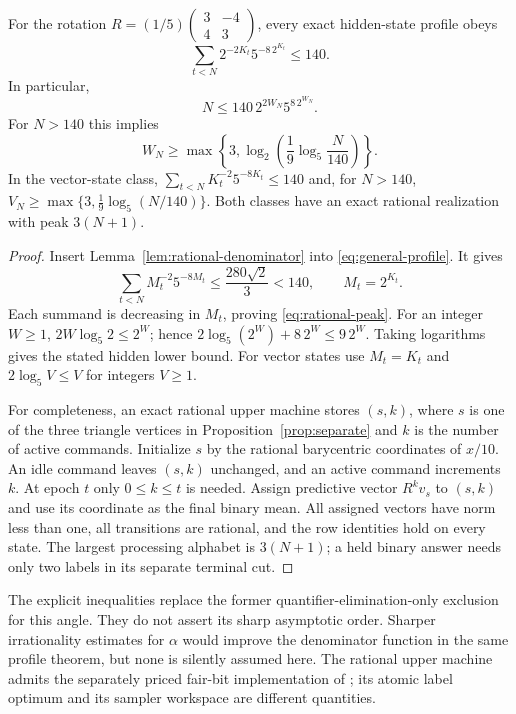 \begin{theorem}\label{thm:rational}
For the rotation $R=(1/5)\left(\begin{smallmatrix}3&-4\\4&3\end{smallmatrix}\right)$,
every exact hidden-state profile obeys
\begin{equation}\label{eq:rational-profile}
           \sum_{t<N}2^{-2K_t}5^{-8\,2^{K_t}}\le140.
\end{equation}
In particular,
\begin{equation}\label{eq:rational-peak}
                 N\le140\,2^{2W_N}5^{8\,2^{W_N}}.
\end{equation}
For $N>140$ this implies
\[
 W_N\ge\max\left\{3,
       \log_2\left(\frac19\log_5\frac N{140}\right)\right\}.
\]
In the vector-state class,
$\sum_{t<N}K_t^{-2}5^{-8K_t}\le140$ and, for $N>140$,
$V_N\ge\max\{3,\frac19\log_5(N/140)\}$.
Both classes have an exact rational realization with peak $3(N+1)$.
\end{theorem}
\begin{proof}
Insert Lemma~\ref{lem:rational-denominator} into
\eqref{eq:general-profile}. It gives
\[
 \sum_{t<N}M_t^{-2}5^{-8M_t}
       \le\frac{280\sqrt2}{3}<140,
 \qquad M_t=2^{K_t}.
\]
Each summand is decreasing in $M_t$, proving \eqref{eq:rational-peak}.
For an integer $W\ge1$, $2W\log_5 2\le2^W$; hence
$2\log_5(2^W)+8\,2^W\le9\,2^W$.
Taking logarithms gives the stated hidden lower bound.
For vector states use $M_t=K_t$ and
$2\log_5 V\le V$ for integers $V\ge1$.

For completeness, an exact rational upper machine stores $(s,k)$,
where $s$ is one of the three triangle vertices in
Proposition~\ref{prop:separate} and $k$ is the number of active commands.
Initialize $s$ by the rational barycentric coordinates of $x/10$.
An idle command leaves $(s,k)$ unchanged, and an active command increments
$k$. At epoch $t$ only $0\le k\le t$ is needed. Assign predictive vector
$R^k v_s$ to $(s,k)$ and use its coordinate as the final binary mean.
All assigned vectors have norm less than one, all transitions are
rational, and the row identities hold on every state. The largest
processing alphabet is $3(N+1)$; a held binary answer needs only two
labels in its separate terminal cut.
\end{proof}

The explicit inequalities replace the former quantifier-elimination-only
exclusion for this angle. They do not assert its sharp asymptotic order.
Sharper irrationality estimates for $\alpha$ would improve the denominator
function in the same profile theorem, but none is silently assumed here.
The rational upper machine admits the separately priced fair-bit
implementation of \cite{GTF31}; its atomic label optimum and its sampler
workspace are different quantities.

